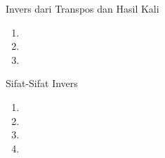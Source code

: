 %
\begin{theorem}{Invers dari Transpos dan Hasil Kali}\label{thm:inversetransposeprod}
\begin{enumerate}
\item
\item
\item
\end{enumerate}
\end{theorem}
%
%
\begin{theorem}{Sifat-Sifat Invers}\label{thm:inverseproperties}
\begin{enumerate}
\item
\item
\item
\item
\end{enumerate}
\end{theorem}
